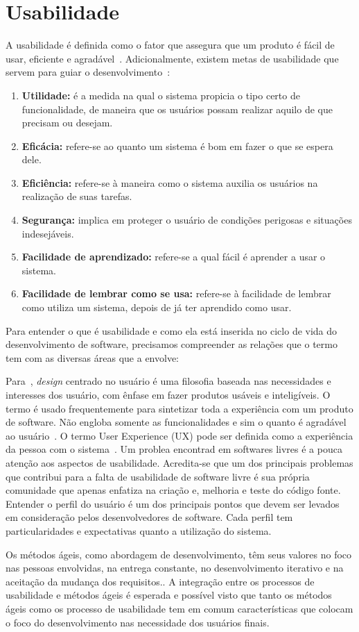 \section{Usabilidade}
\label{sec:usabilidade}

A usabilidade é definida como o fator que assegura que um produto é fácil de usar, eficiente e agradável~\cite{preece2007}.
Adicionalmente, existem metas de usabilidade que servem para guiar o desenvolvimento~\cite{preece2007}:

\begin{enumerate}
	\item \textbf{Utilidade:} é a medida na qual o sistema propicia o tipo certo de funcionalidade, de maneira que os usuários possam realizar aquilo de que precisam ou desejam.
	\item \textbf{Eficácia:} refere-se ao quanto um sistema é bom em fazer o que se espera dele.
	\item \textbf{Eficiência:} refere-se à maneira como o sistema auxilia os usuários na realização de suas tarefas.
	\item \textbf{Segurança:} implica em proteger o usuário de condições perigosas e situações indesejáveis.
	\item \textbf{Facilidade de aprendizado:} refere-se a qual fácil é aprender a usar o sistema.
	\item \textbf{Facilidade de lembrar como se usa:} refere-se à facilidade de lembrar como utiliza um sistema, depois de já ter aprendido como usar.
\end{enumerate}

Para entender o que é usabilidade e como ela está inserida no ciclo de vida do desenvolvimento de software, precisamos compreender as relações que o termo tem com as diversas áreas que a envolve: 


Para~\cite{norman2006design}, \emph{design} centrado no usuário é uma filosofia baseada nas necessidades e interesses dos usuário, com ênfase em fazer produtos usáveis e inteligíveis.
%
O termo é usado frequentemente para sintetizar toda a experiência com um produto de software. Não engloba  somente as funcionalidades e sim o quanto é agradável ao usuário~\cite{travis2013}.
%	
O termo User Experience (UX) pode ser definida como a experiência da pessoa com o sistema~\cite{norman2006design}.
%
Um problea encontrad em softwares livres é a pouca atenção aos aspectos de usabilidade. Acredita-se que um dos principais problemas que contribui para a falta de usabilidade de software livre é sua própria comunidade que apenas enfatiza na criação e, melhoria e teste do código fonte.  
%
Entender o perfil do usuário é um dos principais pontos que devem ser levados em consideração pelos desenvolvedores de software. Cada perfil tem particularidades e expectativas quanto a utilização do sistema. 

Os métodos ágeis, como abordagem de desenvolvimento, têm seus valores no foco nas pessoas envolvidas, na entrega constante, no desenvolvimento iterativo e na aceitação da mudança dos requisitos.. 
%
A integração entre os processos de usabilidade e métodos ágeis é esperada e possível visto que tanto os métodos ágeis como os processo de usabilidade tem em comum características que colocam o foco do desenvolvimento nas necessidade dos usuários finais.
